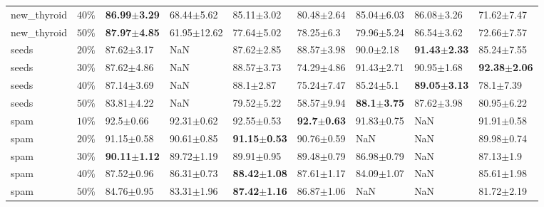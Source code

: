 \begin{tabular}{lllllllll}
  new_thyroid &     $ 40\% $ & \textbf{86.99$\pm$3.29} &  68.44$\pm$5.62 &          85.11$\pm$3.02 &          80.48$\pm$2.64 &          85.04$\pm$6.03 &          86.08$\pm$3.26 &          71.62$\pm$7.47 \\
  new_thyroid &     $ 50\% $ & \textbf{87.97$\pm$4.85} & 61.95$\pm$12.62 &          77.64$\pm$5.02 &           78.25$\pm$6.3 &          79.96$\pm$5.24 &          86.54$\pm$3.62 &          72.66$\pm$7.57 \\
        seeds &     $ 20\% $ &          87.62$\pm$3.17 &             NaN &          87.62$\pm$2.85 &          88.57$\pm$3.98 &           90.0$\pm$2.18 & \textbf{91.43$\pm$2.33} &          85.24$\pm$7.55 \\
        seeds &     $ 30\% $ &          87.62$\pm$4.86 &             NaN &          88.57$\pm$3.73 &          74.29$\pm$4.86 &          91.43$\pm$2.71 &          90.95$\pm$1.68 & \textbf{92.38$\pm$2.06} \\
        seeds &     $ 40\% $ &          87.14$\pm$3.69 &             NaN &           88.1$\pm$2.87 &          75.24$\pm$7.47 &           85.24$\pm$5.1 & \textbf{89.05$\pm$3.13} &           78.1$\pm$7.39 \\
        seeds &     $ 50\% $ &          83.81$\pm$4.22 &             NaN &          79.52$\pm$5.22 &          58.57$\pm$9.94 &  \textbf{88.1$\pm$3.75} &          87.62$\pm$3.98 &          80.95$\pm$6.22 \\
         spam &     $ 10\% $ &           92.5$\pm$0.66 &  92.31$\pm$0.62 &          92.55$\pm$0.53 &  \textbf{92.7$\pm$0.63} &          91.83$\pm$0.75 &                     NaN &          91.91$\pm$0.58 \\
         spam &     $ 20\% $ &          91.15$\pm$0.58 &  90.61$\pm$0.85 & \textbf{91.15$\pm$0.53} &          90.76$\pm$0.59 &                     NaN &                     NaN &          89.98$\pm$0.74 \\
         spam &     $ 30\% $ & \textbf{90.11$\pm$1.12} &  89.72$\pm$1.19 &          89.91$\pm$0.95 &          89.48$\pm$0.79 &          86.98$\pm$0.79 &                     NaN &           87.13$\pm$1.9 \\
         spam &     $ 40\% $ &          87.52$\pm$0.96 &  86.31$\pm$0.73 & \textbf{88.42$\pm$1.08} &          87.61$\pm$1.17 &          84.09$\pm$1.07 &                     NaN &          85.61$\pm$1.98 \\
         spam &     $ 50\% $ &          84.76$\pm$0.95 &  83.31$\pm$1.96 & \textbf{87.42$\pm$1.16} &          86.87$\pm$1.06 &                     NaN &                     NaN &          81.72$\pm$2.19 \\

\end{tabular}
